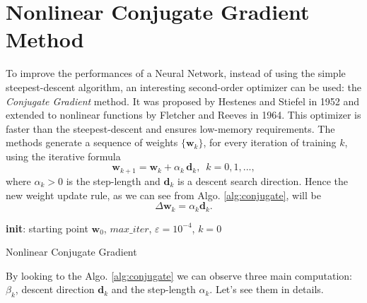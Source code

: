 \section{Nonlinear Conjugate Gradient Method}
\label{sec:NCG}
To improve the performances of a Neural Network, instead of using the simple steepest-descent algorithm, an interesting second-order optimizer can be used: the \emph{Conjugate Gradient} method. It was proposed by Hestenes and Stiefel \cite{Hestenes1952} in 1952 and extended to nonlinear functions by Fletcher and Reeves \cite{Fletcher1964} in 1964. This optimizer is faster than the steepest-descent and ensures low-memory requirements. The methods generate a sequence of weights $\{ \mathbf{w}_k \}$, for every iteration of training $k$, using the iterative formula
\begin{equation}
    \mathbf{w}_{k+1}=\mathbf{w}_k + \alpha_k \, \mathbf{d}_k, \,\,\, k=0,1,...,\label{eq:9}
\end{equation}
where $\alpha_k > 0$ is the step-length and $\mathbf{d}_k$ is a descent search direction. Hence the new weight update rule, as we can see from Algo. \ref{alg:conjugate}, will be
\begin{equation}
    \Delta \mathbf{w}_k = \alpha_k \mathbf{d}_k.
\end{equation}
\begin{algorithm}[H]
\label{alg:conjugate}
\SetAlgoLined
 \textbf{init}: starting point $\mathbf{w}_0$, $max\_iter$, $\varepsilon = 10^{-4}$, $k = 0$\;
 \caption{Nonlinear Conjugate Gradient}
\end{algorithm}
\vspace{+6pt}
\noindent By looking to the Algo. \ref{alg:conjugate} we can observe three main computation: $\beta_k$, descent direction $\mathbf{d}_k$ and the step-length $\alpha_k$. Let's see them in details.
